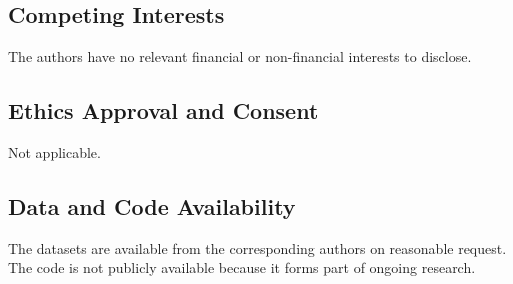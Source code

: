 \documentclass[pdflatex,iicol,Numbered,sn-basic]{sn-jnl}
\begin{document}
\subsection*{Competing Interests}

The authors have no relevant financial or non-financial interests to disclose.

\subsection*{Ethics Approval and Consent}

Not applicable.

\subsection*{Data and Code Availability}

The datasets are available from the corresponding authors on reasonable request. The code is not publicly available because it forms part of ongoing research.
\end{document}
